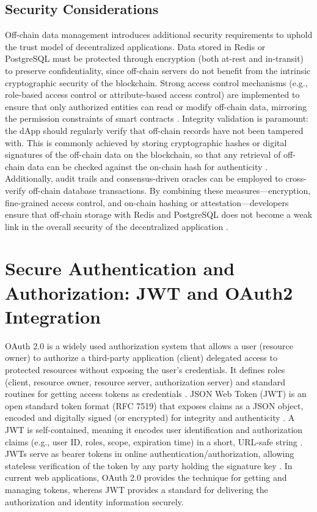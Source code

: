 \documentclass[a4paper,10pt]{report}
\begin{document}
\subsection{Security Considerations}
Off-chain data management introduces additional security requirements to uphold the trust model of decentralized applications. Data stored in Redis or PostgreSQL must be protected through encryption (both at-rest and in-transit) to preserve confidentiality, since off-chain servers do not benefit from the intrinsic cryptographic security of the blockchain. Strong access control mechanisms (e.g., role-based access control or attribute-based access control) are implemented to ensure that only authorized entities can read or modify off-chain data, mirroring the permission constraints of smart contracts \cite{eren2025storage, eren2025storage}. Integrity validation is paramount: the dApp should regularly verify that off-chain records have not been tampered with. This is commonly achieved by storing cryptographic hashes or digital signatures of the off-chain data on the blockchain, so that any retrieval of off-chain data can be checked against the on-chain hash for authenticity \cite{lopez2019health, eren2025storage}. Additionally, audit trails and consensus-driven oracles can be employed to cross-verify off-chain database transactions. By combining these measures—encryption, fine-grained access control, and on-chain hashing or attestation—developers ensure that off-chain storage with Redis and PostgreSQL does not become a weak link in the overall security of the decentralized application \cite{lopez2019health}.

\section{Secure Authentication and Authorization: JWT and OAuth2 Integration}

OAuth 2.0 is a widely used authorization system that allows a user (resource owner) to authorize a third-party application (client) delegated access to protected resources without exposing the user's credentials.  It defines roles (client, resource owner, resource server, authorization server) and standard routines for getting access tokens as credentials \cite{hardt2012oauth}.  JSON Web Token (JWT) is an open standard token format (RFC 7519) that exposes claims as a JSON object, encoded and digitally signed (or encrypted) for integrity and authenticity \cite{bradley2015jwt}.  A JWT is self-contained, meaning it encodes user identification and authorization claims (e.g., user ID, roles, scope, expiration time) in a short, URL-safe string \cite{bradley2015jwt}.  JWTs serve as bearer tokens in online authentication/authorization, allowing stateless verification of the token by any party holding the signature key \cite{bradley2015jwt}.  In current web applications, OAuth 2.0 provides the technique for getting and managing tokens, whereas JWT provides a standard for delivering the authorization and identity information securely.
\end{document}

